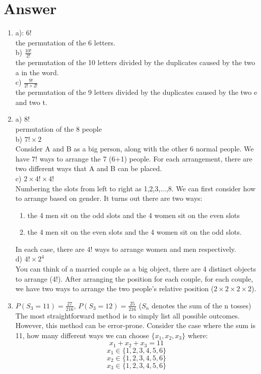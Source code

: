 \documentclass[11pt]{article}
\begin{document}
\section{Answer}
\begin{enumerate}
  \item a): $6!$ 
  \\ the permutation of the 6 letters.
  \\ b) $\frac{10!}{2!}$ 
  \\ the permutation of the 10 letters divided by the duplicates caused by the two a in the word.
  \\ c) $\frac{9!}{2! \times 2!}$ 
  \\ the permutation of the 9 letters divided by the duplicates caused by the two e and two t.
  \item a) $8!$ 
  \\ permutation of the 8 people  
  \\ b) $7! \times 2$ 
  \\Consider A and B as a big person, along with the other 6 normal people. We have $7!$ ways to arrange the 7 (6+1) people. For each arrangement, there are two different ways that A and B can be placed.
  \\ c) $2 \times 4! \times 4!$ 
  \\ Numbering the slots from left to right as 1,2,3,...,8. 
  We can first consider how to arrange based on gender. 
  It turns out there are two ways: 
  \begin{enumerate}
    \item the 4 men sit on the odd slots and the 4 women sit on the even slots 
    \item the 4 men sit on the even slots and the 4 women sit on the odd slots.
  \end{enumerate}
  In each case, there are 4! ways to arrange women and men respectively.
  \\ d) $4! \times 2^4$ 
  \\ You can think of a married couple as a big object, there are 4 distinct objects to arrange (4!). 
  After arranging the position for each couple, for each couple, we have two ways to arrange the two people's relative position ($2 \times 2 \times 2 \times 2$).
  \item $P(S_3=11) = \frac{27}{216}$, $P(S_3=12) = \frac{25}{216}$ ($S_n$ denotes the sum of the n tosses) 
  \\ The most straightforward method is to simply list all possible outcomes.
  However, this method can be error-prone. 
  Consider the case where the sum is 11, 
  how many different ways we can choose $\{x_1,x_2,x_3\}$ where:
  $$x_1 + x_2 + x_3 = 11$$
  $$x_1 \in \{1,2,3,4,5,6\}$$
  $$x_2 \in \{1,2,3,4,5,6\}$$
  $$x_3 \in \{1,2,3,4,5,6\}$$
  

\end{enumerate}
\end{document}

